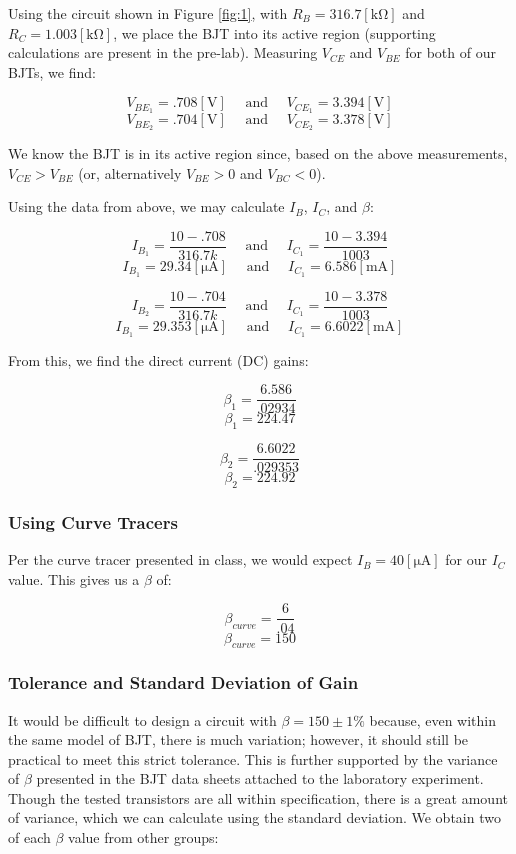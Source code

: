 \documentclass[
	letterpaper, %
	10pt, %
]{CSUniSchoolLabReport}
\begin{document}
Using the circuit shown in Figure \ref{fig:1}, with $R_B=316.7[\si{\kilo\ohm}]$ and $R_C=1.003[\si{\kilo\ohm}]$, we place the BJT into its active region (supporting calculations are present in the pre-lab). Measuring $V_{CE}$ and $V_{BE}$ for both of our BJTs, we find:

$$V_{BE_1}=.708[\si{\volt}]\quad\text{ and }\quad V_{CE_1}=3.394[\si{\volt}]$$
$$V_{BE_2}=.704[\si{\volt}]\quad\text{ and }\quad V_{CE_2}=3.378[\si{\volt}]$$

We know the BJT is in its active region since, based on the above measurements, $V_{CE}>V_{BE}$ (or, alternatively $V_{BE}>0$ and $V_{BC}<0$).

Using the data from above, we may calculate $I_B$, $I_C$, and $\beta$:

$$I_{B_1}=\frac{10-.708}{316.7k}\quad\text{ and }\quad I_{C_1}=\frac{10-3.394}{1003}$$
$$\boxed{I_{B_1}=29.34[\si{\micro\ampere}]\quad\text{ and }\quad I_{C_1}=6.586[\si{\milli\ampere}]}$$

$$I_{B_2}=\frac{10-.704}{316.7k}\quad\text{ and }\quad I_{C_1}=\frac{10-3.378}{1003}$$
$$\boxed{I_{B_1}=29.353[\si{\micro\ampere}]\quad\text{ and }\quad I_{C_1}=6.6022[\si{\milli\ampere}]}$$

From this, we find the direct current (DC) gains:

$$\beta_1=\frac{6.586}{.02934}$$
$$\boxed{\beta_1=224.47}$$

$$\beta_2=\frac{6.6022}{.029353}$$
$$\boxed{\beta_2=224.92}$$

\subsubsection{Using Curve Tracers}

Per the curve tracer presented in class, we would expect $I_B=40[\si{\micro\ampere}]$ for our $I_C$ value. This gives us a $\beta$ of:

$$\beta_{curve}=\frac{6}{.04}$$
$$\boxed{\beta_{curve}=150}$$

\subsubsection{Tolerance and Standard Deviation of Gain}

It would be difficult to design a circuit with $\beta=150\pm 1\%$ because, even within the same model of BJT, there is much variation; however, it should still be practical to meet this strict tolerance. This is further supported by the variance of $\beta$ presented in the BJT data sheets attached to the laboratory experiment. Though the tested transistors are all within specification, there is a great amount of variance, which we can calculate using the standard deviation. We obtain two of each $\beta$ value from other groups:
\end{document}
